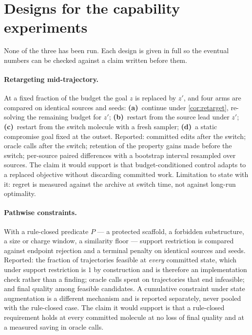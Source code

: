 \section{Designs for the capability experiments}
\label{app:capdesign}

None of the three has been run. Each design is given in full so the eventual numbers can be checked against a claim written before them.

\paragraph{Retargeting mid-trajectory.}
At a fixed fraction of the budget the goal $z$ is replaced by $z'$, and four arms are compared on identical sources and seeds: \textbf{(a)}~continue under \cref{cor:retarget}, re-solving the remaining budget for $z'$; \textbf{(b)}~restart from the source lead under $z'$; \textbf{(c)}~restart from the switch molecule with a fresh sampler; \textbf{(d)}~a static compromise goal fixed at the outset.
Reported: committed edits after the switch; oracle calls after the switch; retention of the property gains made before the switch; per-source paired differences with a bootstrap interval resampled over sources.
The claim it would support is that budget-conditioned control adapts to a replaced objective without discarding committed work.
Limitation to state with it: regret is measured against the archive at switch time, not against long-run optimality.

\paragraph{Pathwise constraints.}
With a rule-closed predicate $P$ --- a protected scaffold, a forbidden substructure, a size or charge window, a similarity floor --- support restriction is compared against endpoint rejection and a terminal penalty on identical sources and seeds.
Reported: the fraction of trajectories feasible at \emph{every} committed state, which under support restriction is $1$ by construction and is therefore an implementation check rather than a finding; oracle calls spent on trajectories that end infeasible; and final quality among feasible candidates.
A cumulative constraint under state augmentation is a different mechanism and is reported separately, never pooled with the rule-closed case.
The claim it would support is that a rule-closed requirement holds at every committed molecule at no loss of final quality and at a measured saving in oracle calls.

